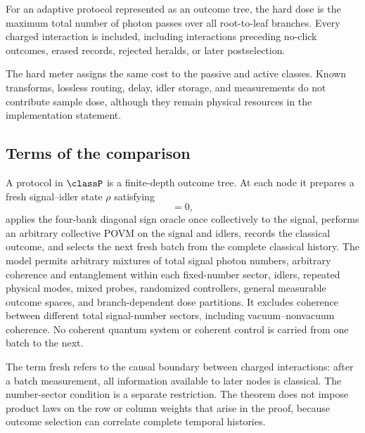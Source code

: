 \begin{definition}
For an adaptive protocol represented as an outcome tree, the hard dose is the maximum total number of photon passes over all root-to-leaf branches. Every charged interaction is included, including interactions preceding no-click outcomes, erased records, rejected heralds, or later postselection.
\end{definition}

The hard meter assigns the same cost to the passive and active classes. Known transforms, lossless routing, delay, idler storage, and measurements do not contribute sample dose, although they remain physical resources in the implementation statement.

\subsection{Terms of the comparison}

\begin{definition}
A protocol in $\classP$ is a finite-depth outcome tree. At each node it prepares a fresh signal--idler state $\rho$ satisfying
\begin{equation}
[\rho,\widehat N_{\rm sig}\otimes I_{\rm id}]=0,
\label{eq:model-number-sector}
\end{equation}
applies the four-bank diagonal sign oracle once collectively to the signal, performs an arbitrary collective POVM on the signal and idlers, records the classical outcome, and selects the next fresh batch from the complete classical history. The model permits arbitrary mixtures of total signal photon numbers, arbitrary coherence and entanglement within each fixed-number sector, idlers, repeated physical modes, mixed probes, randomized controllers, general measurable outcome spaces, and branch-dependent dose partitions. It excludes coherence between different total signal-number sectors, including vacuum--nonvacuum coherence. No coherent quantum system or coherent control is carried from one batch to the next.
\end{definition}

The term fresh refers to the causal boundary between charged interactions: after a batch measurement, all information available to later nodes is classical. The number-sector condition is a separate restriction. The theorem does not impose product laws on the row or column weights that arise in the proof, because outcome selection can correlate complete temporal histories.

